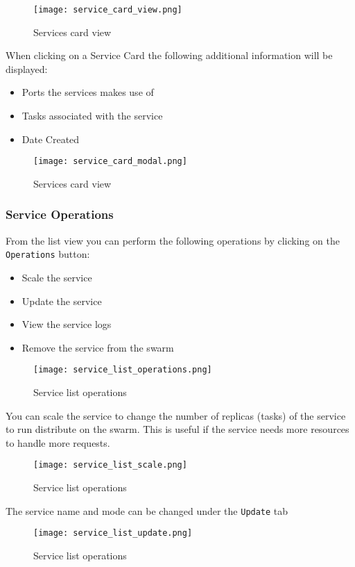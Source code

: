 \documentclass[]{article}
\providecommand{\tightlist}{%
	\setlength{\itemsep}{0pt}\setlength{\parskip}{0pt}}
\let\oldtexttt\texttt
\renewcommand{\texttt}[1]{
	\colorbox{Light}{\oldtexttt{#1}}
}
\begin{document}
\begin{figure}[H]
	\centering
	\texttt{[image: service\_card\_view.png]}
	\caption{Services card view}
\end{figure}

When clicking on a Service Card the following additional information will be displayed:
\begin{itemize}
	\tightlist
	\item Ports the services makes use of
	\item Tasks associated with the service
	\item Date Created
\end{itemize}

\begin{figure}[H]
	\centering
	\texttt{[image: service\_card\_modal.png]}
	\caption{Services card view}
\end{figure}

\subsubsection{Service Operations}
From the list view you can perform the following operations by clicking on the \texttt{Operations} button:
\begin{itemize}
	\tightlist
	\item Scale the service
	\item Update the service
	\item View the service logs
	\item Remove the service from the swarm
\end{itemize}

\begin{figure}[H]
	\centering
	\texttt{[image: service\_list\_operations.png]}
	\caption{Service list operations}
\end{figure}

You can scale the service to change the number of replicas (tasks) of the service to run distribute on the swarm.
This is useful if the service needs more resources to handle more requests.

\begin{figure}[H]
	\centering
	\texttt{[image: service\_list\_scale.png]}
	\caption{Service list operations}
\end{figure}

The service name and mode can be changed under the \texttt{Update} tab
\begin{figure}[H]
	\centering
	\texttt{[image: service\_list\_update.png]}
	\caption{Service list operations}
\end{figure}
\end{document}
